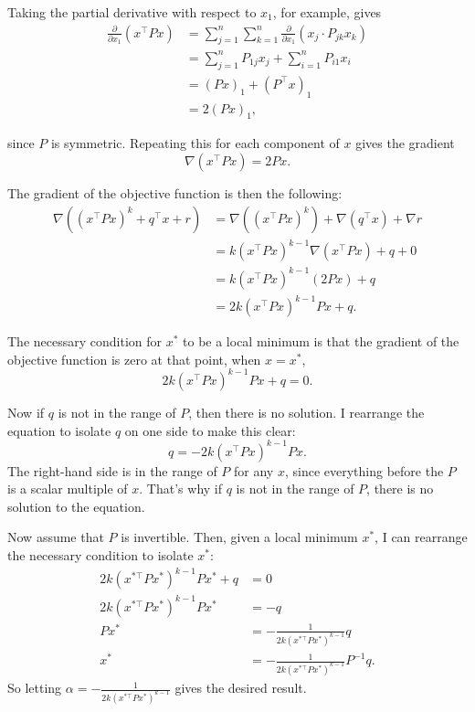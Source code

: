 \begin{homeworkProblem}
\begin{solution}
        Taking the partial derivative with respect to $x_1$, for example, gives
        \begin{align*}
            \frac{\partial}{\partial x_1} (x^\top P x)
            &= \sum_{j=1}^n \sum_{k=1}^n \frac{\partial}{\partial x_1} (x_j \cdot P_{jk} x_k) \\
            &= \sum_{j=1}^n P_{1j} x_j + \sum_{i=1}^n P_{i1} x_i \\
            &= (P x)_1 + (P^\top x)_1 \\
            &= 2 (P x)_1,
        \end{align*}

        since $P$ is symmetric. Repeating this for each component of $x$ gives the
        gradient
        \[
            \nabla (x^\top P x) = 2 P x.
        \]

        The gradient of the objective function is then the following:
        \begin{align*}
            \nabla \left( (x^\top P x)^k + q^\top x + r \right)
            &= \nabla \left( (x^\top P x)^k \right) + \nabla (q^\top x) + \nabla r \\
            &= k (x^\top P x)^{k-1} \nabla (x^\top P x) + q + 0 \\
            &= k (x^\top P x)^{k-1} (2 P x) + q \\
            &= 2 k (x^\top P x)^{k-1} P x + q.
        \end{align*}

        The necessary condition for $x^*$ to be a local minimum is that the gradient
        of the objective function is zero at that point, when $x = x^*$,
        \[
            2 k (x^{\top} P x)^{k-1} P x + q = 0.
        \]  

        Now if $q$ is not in the range of $P$, then there is no solution. 
        I rearrange the equation to isolate $q$ on one side to make this clear:
        \[
            q = -2 k (x^{\top} P x)^{k-1} P x.
        \]
        The right-hand side is in the range of $P$ for any $x$, since everything before
        the $P$ is a scalar multiple of $x$. That's why if $q$ is not in the range
        of $P$, there is no solution to the equation.

        Now assume that $P$ is invertible. Then, given a local minimum $x^*$, I can
        rearrange the necessary condition to isolate $x^*$:
        \begin{align*}
            2 k (x^{*\top} P x^*)^{k-1} P x^* + q &= 0 \\
            2 k (x^{*\top} P x^*)^{k-1} P x^* &= -q \\
            P x^* &= -\frac{1}{2 k (x^{*\top} P x^*)^{k-1}} q \\
            x^* &= -\frac{1}{2 k (x^{*\top} P x^*)^{k-1}} P^{-1} q.
        \end{align*}
        So letting $\alpha = -\frac{1}{2 k (x^{*\top} P x^*)^{k-1}}$ gives the desired result.


\end{solution}
\end{homeworkProblem}
